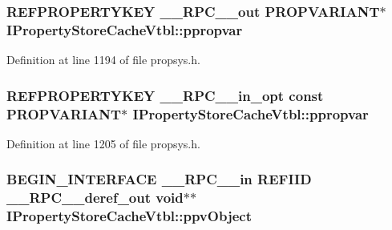 \subsubsection[{\texorpdfstring{ppropvar}{ppropvar}}]{ {\bf R\+E\+F\+P\+R\+O\+P\+E\+R\+T\+Y\+K\+EY} {\bf \+\_\+\+\_\+\+R\+P\+C\+\_\+\+\_\+out} {\bf P\+R\+O\+P\+V\+A\+R\+I\+A\+NT}$\ast$ I\+Property\+Store\+Cache\+Vtbl\+::ppropvar}\hypertarget{struct_i_property_store_cache_vtbl_ab97546f7ddd1f9c6a56a3d426cb235c8}{}\label{struct_i_property_store_cache_vtbl_ab97546f7ddd1f9c6a56a3d426cb235c8}


Definition at line 1194 of file propsys.\+h.

\subsubsection[{\texorpdfstring{ppropvar}{ppropvar}}]{ {\bf R\+E\+F\+P\+R\+O\+P\+E\+R\+T\+Y\+K\+EY} {\bf \+\_\+\+\_\+\+R\+P\+C\+\_\+\+\_\+in\+\_\+opt} {\bf const} {\bf P\+R\+O\+P\+V\+A\+R\+I\+A\+NT}$\ast$ I\+Property\+Store\+Cache\+Vtbl\+::ppropvar}\hypertarget{struct_i_property_store_cache_vtbl_a51ed5fef912160736bf967d72076714b}{}\label{struct_i_property_store_cache_vtbl_a51ed5fef912160736bf967d72076714b}


Definition at line 1205 of file propsys.\+h.

\subsubsection[{\texorpdfstring{ppv\+Object}{ppvObject}}]{\setlength{\rightskip}{0pt plus 5cm}B\+E\+G\+I\+N\+\_\+\+I\+N\+T\+E\+R\+F\+A\+CE {\bf \+\_\+\+\_\+\+R\+P\+C\+\_\+\+\_\+in} {\bf R\+E\+F\+I\+ID} {\bf \+\_\+\+\_\+\+R\+P\+C\+\_\+\+\_\+deref\+\_\+out} {\bf void}$\ast$$\ast$ I\+Property\+Store\+Cache\+Vtbl\+::ppv\+Object}\hypertarget{struct_i_property_store_cache_vtbl_aa8d819b5ae1e4eb3a204911e56123eb9}{}\label{struct_i_property_store_cache_vtbl_aa8d819b5ae1e4eb3a204911e56123eb9}



